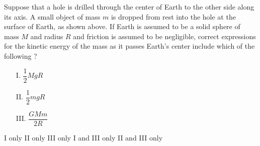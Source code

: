 \documentclass[12pt]{../../oss-classkick-exam}
\begin{document}
\begin{questions}
  \question Suppose that a hole is drilled through the center of Earth to the
  other side along its axis. A small object of mass $m$ is dropped from rest
  into the hole at the surface of Earth, as shown above. If Earth is assumed to
  be a solid sphere of mass $M$ and radius $R$ and friction is assumed to be
  negligible, correct expressions for the kinetic energy of the mass as it
  passes Earth's center include which of the following ?
  \begin{enumerate}[nosep]
  \item[I.] $\dfrac12MgR$
  \item[II.] $\dfrac12mgR$
  \item[III.] $\dfrac{GMm}{2R}$
  \end{enumerate}
  
  \begin{oneparchoices}
    \choice I only
    \choice II only
    \choice III only
    \choice I and III only
    \choice II and III only
  \end{oneparchoices}
\end{questions}
%
%
\end{document}

